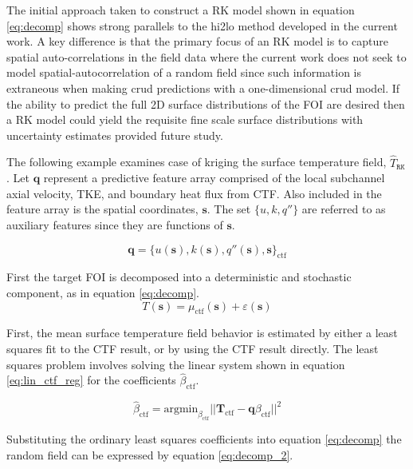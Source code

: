 The initial approach taken to construct a RK model shown in equation \ref{eq:decomp} shows strong parallels to the hi2lo method developed in the current work.  A key difference is that the primary focus of an RK model is to capture spatial auto-correlations in the field data where the current work does not seek to model spatial-autocorrelation of a random field since such information is extraneous when making crud predictions with a one-dimensional crud model.   If the ability to predict the full 2D surface distributions of the FOI are desired then a RK model could yield the requisite fine scale surface distributions with uncertainty estimates provided future study.

The following example examines case of kriging the surface temperature field, $\hat T_\mathtt{RK}$.
Let $\mathbf{q}$ represent a predictive feature array comprised of the local subchannel axial velocity,
TKE, and boundary heat flux from CTF.  Also included in the feature array is the spatial coordinates, $\mathbf s$.  The set $\{u, k, q'' \}$ are referred to as auxiliary features since they are functions of $\mathbf s$.

\begin{equation}
    \mathbf{q} = \{u(\mathbf s), k(\mathbf s), q''(\mathbf s), \mathbf s \}_{\mathrm{ctf}}
\end{equation}

First the target FOI is decomposed into a deterministic and stochastic component, as in equation \ref{eq:decomp}.
\begin{equation}
    T(\mathbf s) = \mu_{\mathrm{ctf}}(\mathbf s) + \varepsilon(\mathbf s)
\label{eq:decomp}
\end{equation}

First, the mean surface temperature field behavior is estimated by either a least squares fit to the CTF result, or by using the CTF result directly.  The least squares problem involves solving the linear system shown in equation \ref{eq:lin_ctf_reg} for the coefficients $\hat{\beta}_{\mathrm{ctf}}$.

\begin{equation}
    \hat \beta_{\mathrm{ctf}} = \mathrm{argmin}_{\beta_{\mathrm{ctf}}} ||\mathbf T_{\mathrm{ctf}} - \mathbf q \beta_{\mathrm{ctf}}||^2
\label{eq:lin_ctf_reg}
\end{equation}

Substituting the ordinary least squares coefficients into equation \ref{eq:decomp} the random field can be expressed by equation \ref{eq:decomp_2}.

